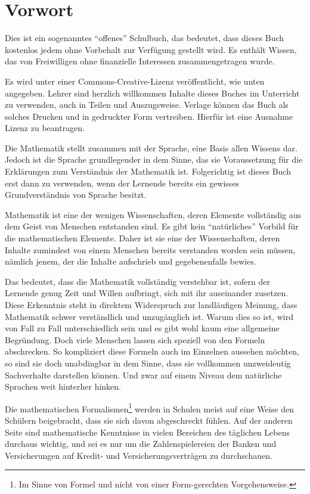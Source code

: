 
\chapter{Vorwort}

Dies ist ein sogenanntes "`offenes"' Schulbuch, das bedeutet, dass dieses Buch kostenlos jedem ohne Vorbehalt zur Verfügung gestellt wird. Es enthält Wissen, das von Freiwilligen ohne finanzielle Interessen zusammengetragen wurde. 

Es wird unter einer Commons-Creative-Lizenz veröffentlicht, wie unten angegeben. Lehrer sind herzlich willkommen Inhalte dieses Buches im Unterricht zu verwenden, auch in Teilen und Auszugsweise. Verlage können das Buch als solches Drucken und in gedruckter Form vertreiben. Hierfür ist eine Ausnahme Lizenz zu beantragen. 

\bigskip

Die Mathematik stellt zusammen mit der Sprache, eine Basis allen Wissens dar. Jedoch ist die Sprache grundlegender in dem Sinne, das sie Voraussetzung für die Erklärungen zum Verständnis der Mathematik ist. Folgerichtig ist dieses Buch erst dann zu verwenden, wenn der Lernende bereits ein gewisses Grundverständnis von Sprache besitzt. 

Mathematik ist eine der wenigen Wissenschaften, deren Elemente vollständig aus dem Geist von Menschen entstanden sind. Es gibt kein "`natürliches"' Vorbild für die mathematischen Elemente. Daher ist sie eine der Wissenschaften, deren Inhalte zumindest von einem Menschen bereits verstanden worden sein müssen, nämlich jenem, der die Inhalte aufschrieb und gegebenenfalls bewies.

Das bedeutet, dass die Mathematik vollständig verstehbar ist, sofern der Lernende genug Zeit und Willen aufbringt, sich mit ihr auseinander zusetzen. Diese Erkenntnis steht in direktem Widerspruch zur landläufigen Meinung, dass Mathematik schwer verständlich und unzugänglich ist. Warum dies so ist, wird von Fall zu Fall unterschiedlich sein und es gibt wohl kaum eine allgemeine Begründung. Doch viele Menschen lassen sich speziell von den Formeln abschrecken. So kompliziert diese Formeln auch im Einzelnen aussehen möchten, so sind sie doch unabdingbar in dem Sinne, dass sie vollkommen unzweideutig Sachverhalte darstellen können. Und zwar auf einem Niveau dem natürliche Sprachen weit hinterher hinken. 

Die mathematischen Formalismen\footnote{Im Sinne von Formel und nicht von einer Form-gerechten Vorgehensweise.} werden in Schulen meist auf eine Weise den Schülern beigebracht, dass sie sich davon abgeschreckt fühlen. Auf der anderen Seite sind mathematische Kenntnisse in vielen Bereichen des täglichen Lebens durchaus wichtig, und sei es nur um die Zahlenspielereien der Banken und Versicherungen auf Kredit- und Versicherungsverträgen zu durchschauen. 

